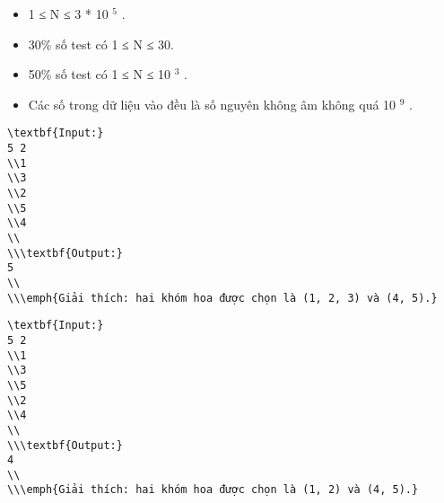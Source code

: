 \begin{itemize}
	\item     1 ≤ N ≤ 3 * 10    $^     5    $    .   
	\item     30\% số test có 1 ≤ N ≤ 30.   
	\item     50\% số test có 1 ≤ N ≤ 10    $^     3    $    .   
	\item     Các số trong dữ liệu vào đều là số nguyên không âm không quá 10    $^     9    $    .   
\end{itemize}
\begin{verbatim}
\textbf{Input:}
5 2
\\1 
\\3 
\\2 
\\5 
\\4
\\
\\\textbf{Output:}
5
\\
\\\emph{Giải thích: hai khóm hoa được chọn là (1, 2, 3) và (4, 5).}\end{verbatim}
\begin{verbatim}
\textbf{Input:}
5 2
\\1 
\\3 
\\5 
\\2 
\\4
\\
\\\textbf{Output:}
4
\\
\\\emph{Giải thích: hai khóm hoa được chọn là (1, 2) và (4, 5).}\end{verbatim}